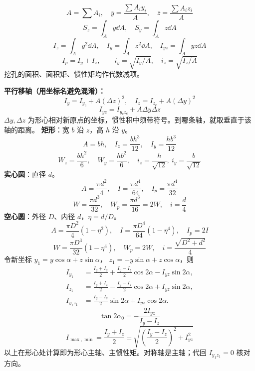 \documentclass[a4paper,10pt,fontset=none]{ctexart}
\begin{document}
\begin{rightcol}
\[
A=\sum A_i,\quad
\bar y=\frac{\sum A_i y_i}{A},\quad
\bar z=\frac{\sum A_i z_i}{A}
\]
\[
S_z=\int_A y\dd A,\quad S_y=\int_A z\dd A
\]
\[
I_z=\int_A y^2\dd A,\quad I_y=\int_A z^2\dd A,\quad
I_{yz}=\int_A yz\dd A
\]
\[
I_p=I_y+I_z,\qquad i_y=\sqrt{I_y/A},\quad i_z=\sqrt{I_z/A}
\]
挖孔的面积、面积矩、惯性矩均作代数减项。

\textbf{平行移轴（用坐标名避免混淆）：}
\[
\boxed{I_y=I_{y_c}+A(\Delta z)^2},\quad
I_z=I_{z_c}+A(\Delta y)^2
\]
\[
I_{yz}=I_{y_cz_c}+A\Delta y\Delta z
\]
$\Delta y,\Delta z$ 为形心相对新原点的坐标，惯性积中须带符号。到哪条轴，就取垂直于该轴的距离。
\textbf{矩形}：宽 $b$ 沿 $z$，高 $h$ 沿 $y$。
\[
A=bh,\quad I_z=\frac{bh^3}{12},\quad I_y=\frac{hb^3}{12}
\]
\[
W_z=\frac{bh^2}{6},\quad W_y=\frac{hb^2}{6},\quad
i_z=\frac{h}{\sqrt{12}},\ i_y=\frac{b}{\sqrt{12}}
\]
\textbf{实心圆}：直径 $d$。
\[
A=\frac{\pi d^2}{4},\quad I=\frac{\pi d^4}{64},\quad I_p=\frac{\pi d^4}{32}
\]
\[
W=\frac{\pi d^3}{32},\quad W_p=\frac{\pi d^3}{16}=2W,\quad i=\frac d4
\]
\textbf{空心圆}：外径 $D$、内径 $d$，$\eta=d/D$。
\[
A=\frac{\pi D^2}{4}(1-\eta^2),\quad
I=\frac{\pi D^4}{64}(1-\eta^4),\quad I_p=2I
\]
\[
W=\frac{\pi D^3}{32}(1-\eta^4),\quad W_p=2W,\quad
i=\frac{\sqrt{D^2+d^2}}4
\]
令新坐标 $y_1=y\cos\alpha+z\sin\alpha$，
$z_1=-y\sin\alpha+z\cos\alpha$，则
\[
\begin{aligned}
I_{y_1}&=\frac{I_y+I_z}{2}+\frac{I_y-I_z}{2}\cos2\alpha-I_{yz}\sin2\alpha,\\
I_{z_1}&=\frac{I_y+I_z}{2}-\frac{I_y-I_z}{2}\cos2\alpha+I_{yz}\sin2\alpha,\\
I_{y_1z_1}&=\frac{I_y-I_z}{2}\sin2\alpha+I_{yz}\cos2\alpha.
\end{aligned}
\]
\[
\tan2\alpha_0=-\frac{2I_{yz}}{I_y-I_z}
\]
\[
I_{\max,\min}=\frac{I_y+I_z}{2}\pm\sqrt{\left(\frac{I_y-I_z}{2}\right)^2+I_{yz}^2}
\]
以上在形心处计算即为形心主轴、主惯性矩。对称轴是主轴；代回 $I_{y_1z_1}=0$ 核对方向。
\end{rightcol}
\end{document}
